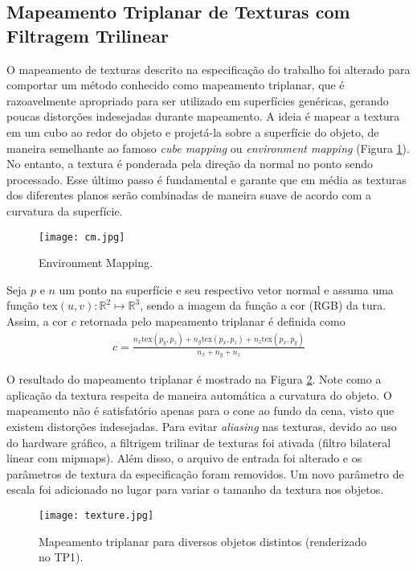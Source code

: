 \documentclass[11pt,a4paper]{article}
\begin{document}
\subsection{Mapeamento Triplanar de Texturas com Filtragem Trilinear}
O mapeamento de texturas descrito na especificação do trabalho foi alterado para comportar um método conhecido como mapeamento triplanar, que é razoavelmente apropriado para ser utilizado em superfícies genéricas, gerando poucas distorções indesejadas durante mapeamento. A ideia é mapear a textura em um cubo ao redor do objeto e projetá-la sobre a superfície do objeto, de maneira semelhante ao famoso \textit{cube mapping} ou \textit{environment mapping} (Figura \ref{fig:cubemap}). No entanto, a textura é ponderada pela direção da normal no ponto sendo processado. Esse último passo é fundamental e garante que em média as texturas dos diferentes planos serão combinadas de maneira suave de acordo com a curvatura da superfície.
\begin{figure}[!htpb]
  \centering
  \texttt{[image: cm.jpg]}
  \caption{Environment Mapping.}
  \label{fig:cubemap}
\end{figure}

Seja $p$ e $n$ um ponto na superfície e seu respectivo vetor normal e assuma uma função $\text{tex}(u,v) : \mathbb{R}^2 \mapsto \mathbb{R}^3$, sendo a imagem da função a cor (RGB) da tura. Assim, a cor $c$ retornada pelo mapeamento triplanar é definida como
\begin{align*}
  c = \frac{n_x\text{tex}(p_y, p_z) + n_y\text{tex}(p_x, p_z) + n_z \text{tex}(p_x, p_y)}{n_x + n_y + n_z}
\end{align*}

O resultado do mapeamento triplanar é mostrado na Figura \ref{fig:triplanar}. Note como a aplicação da textura respeita de maneira automática a curvatura do objeto. O mapeamento não é satisfatório apenas para o cone ao fundo da cena, visto que existem distorções indesejadas. Para evitar \textit{aliasing} nas texturas, devido ao uso do hardware gráfico, a filtrigem trilinar de texturas foi ativada (filtro bilateral linear com mipmaps). Além disso, o arquivo de entrada foi alterado e os parâmetros de textura da especificação foram removidos. Um novo parâmetro de escala foi adicionado no lugar para variar o tamanho da textura nos objetos.

\begin{figure}[!htpb]
  \centering
  \texttt{[image: texture.jpg]}
  \caption{Mapeamento triplanar para diversos objetos distintos (renderizado no TP1).}
  \label{fig:triplanar}
\end{figure}
\newpage
\end{document}

